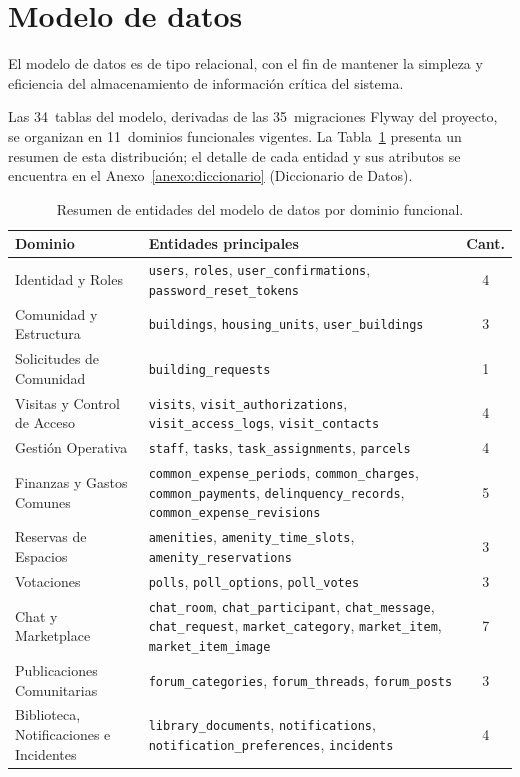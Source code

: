 \section{Modelo de datos}

El modelo de datos es de tipo relacional, con el fin de mantener la simpleza y eficiencia del almacenamiento de información crítica del sistema.

Las 34~tablas del modelo, derivadas de las 35~migraciones Flyway del proyecto, se organizan en 11~dominios funcionales vigentes. La Tabla~\ref{tab:resumen-dominios} presenta un resumen de esta distribución; el detalle de cada entidad y sus atributos se encuentra en el Anexo~\ref{anexo:diccionario} (Diccionario de Datos).

\begin{table}[H]
\centering
\small
\begin{tabular}{|p{}|p{}|c|}
\hline
\textbf{Dominio} & \textbf{Entidades principales} & \textbf{Cant.} \\ \hline
Identidad y Roles & \texttt{users}, \texttt{roles}, \texttt{user\_confirmations}, \texttt{password\_reset\_tokens} & 4 \\ \hline
Comunidad y Estructura & \texttt{buildings}, \texttt{housing\_units}, \texttt{user\_buildings} & 3 \\ \hline
Solicitudes de Comunidad & \texttt{building\_requests} & 1 \\ \hline
Visitas y Control de Acceso & \texttt{visits}, \texttt{visit\_authorizations}, \texttt{visit\_access\_logs}, \texttt{visit\_contacts} & 4 \\ \hline
Gestión Operativa & \texttt{staff}, \texttt{tasks}, \texttt{task\_assignments}, \texttt{parcels} & 4 \\ \hline
Finanzas y Gastos Comunes & \texttt{common\_expense\_periods}, \texttt{common\_charges}, \texttt{common\_payments}, \texttt{delinquency\_records}, \texttt{common\_expense\_revisions} & 5 \\ \hline
Reservas de Espacios & \texttt{amenities}, \texttt{amenity\_time\_slots}, \texttt{amenity\_reservations} & 3 \\ \hline
Votaciones & \texttt{polls}, \texttt{poll\_options}, \texttt{poll\_votes} & 3 \\ \hline
Chat y Marketplace & \texttt{chat\_room}, \texttt{chat\_participant}, \texttt{chat\_message}, \texttt{chat\_request}, \texttt{market\_category}, \texttt{market\_item}, \texttt{market\_item\_image} & 7 \\ \hline
Publicaciones Comunitarias & \texttt{forum\_categories}, \texttt{forum\_threads}, \texttt{forum\_posts} & 3 \\ \hline
Biblioteca, Notificaciones e Incidentes & \texttt{library\_documents}, \texttt{notifications}, \texttt{notification\_preferences}, \texttt{incidents} & 4 \\ \hline
\end{tabular}
\caption{Resumen de entidades del modelo de datos por dominio funcional.}
\label{tab:resumen-dominios}
\end{table}

